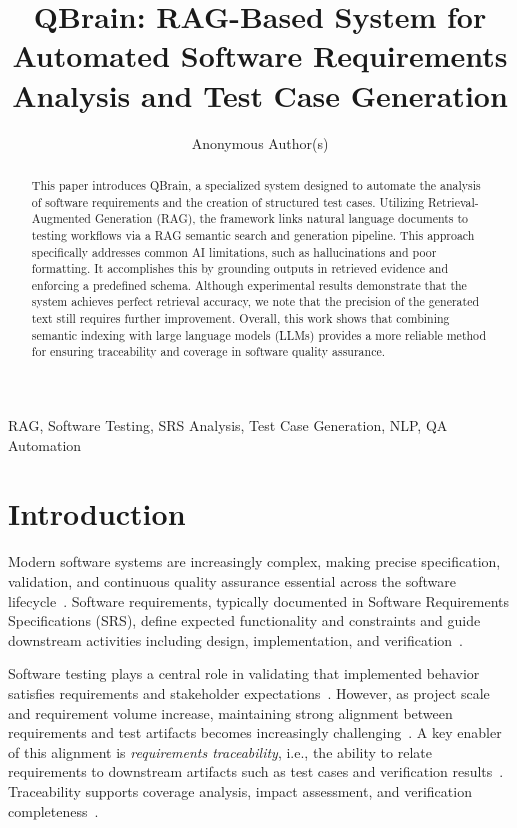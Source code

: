 \documentclass[conference]{IEEEtran}
\title{QBrain: RAG-Based System for Automated Software Requirements Analysis and Test Case Generation}
\author{Anonymous Author(s)}
\begin{document}
\maketitle

\begin{abstract}
This paper introduces QBrain, a specialized system designed to automate the analysis of software requirements and the creation of structured test cases. Utilizing Retrieval-Augmented Generation (RAG), the framework links natural language documents to testing workflows via a RAG semantic search and generation pipeline. This approach specifically addresses common AI limitations, such as hallucinations and poor formatting. It accomplishes this by grounding outputs in retrieved evidence and enforcing a predefined schema. Although experimental results demonstrate that the system achieves perfect retrieval accuracy, we note that the precision of the generated text still requires further improvement. Overall, this work shows that combining semantic indexing with large language models (LLMs) provides a more reliable method for ensuring traceability and coverage in software quality assurance.
\end{abstract}

\begin{IEEEkeywords}
RAG, Software Testing, SRS Analysis, Test Case Generation, NLP, QA Automation
\end{IEEEkeywords}

\section{Introduction}
\label{sec:intro}

Modern software systems are increasingly complex, making precise specification, validation, and continuous quality assurance essential across the software lifecycle~\cite{sommerville2015}. Software requirements, typically documented in Software Requirements Specifications (SRS), define expected functionality and constraints and guide downstream activities including design, implementation, and verification~\cite{sommerville2015,ieee29148}.

Software testing plays a central role in validating that implemented behavior satisfies requirements and stakeholder expectations~\cite{wang2025}. However, as project scale and requirement volume increase, maintaining strong alignment between requirements and test artifacts becomes increasingly challenging~\cite{wang2025}. A key enabler of this alignment is \textit{requirements traceability}, i.e., the ability to relate requirements to downstream artifacts such as test cases and verification results~\cite{palo2003}. Traceability supports coverage analysis, impact assessment, and verification completeness~\cite{palo2003}.
\end{document}
